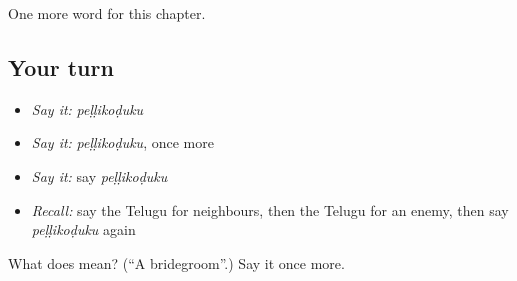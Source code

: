 \begin{grammarlens}[title={What you've built}]
One more word for this chapter.
\end{grammarlens}

\subsection*{Your turn}
\begin{itemize}
\raggedright
  \item \emph{Say it:} \emph{peḷḷikoḍuku}
  \item \emph{Say it:} \emph{peḷḷikoḍuku}, once more
  \item \emph{Say it:} say \emph{peḷḷikoḍuku}
  \item \emph{Recall:} say the Telugu for neighbours, then the Telugu for an enemy, then say \emph{peḷḷikoḍuku} again
\end{itemize}

\begin{tcolorbox}[breakable,colback=teal!4,colframe=teal!35!black,title={Before you move on}]
What does  mean? (\textquotedblleft{}A bridegroom\textquotedblright{}.) Say it once more.
\end{tcolorbox}
